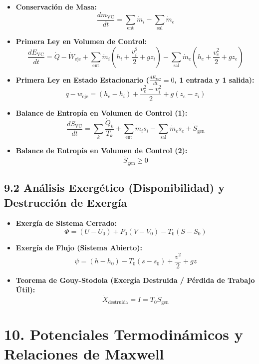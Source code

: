 \documentclass[11pt,a4paper]{article}
\begin{document}
\begin{itemize}
  \item \textbf{Conservación de Masa:}
  \[
    \frac{dm_{\mathrm{VC}}}{dt} = \sum_{\mathrm{ent}} \dot{m}_i - \sum_{\mathrm{sal}} \dot{m}_e
  \]
  \item \textbf{Primera Ley en Volumen de Control:}
  \[
    \frac{dE_{\mathrm{VC}}}{dt} = \dot{Q} - \dot{W}_{\mathrm{eje}} + \sum_{\mathrm{ent}} \dot{m}_i \left( h_i + \frac{v_i^2}{2} + g z_i \right) - \sum_{\mathrm{sal}} \dot{m}_e \left( h_e + \frac{v_e^2}{2} + g z_e \right)
  \]
  \item \textbf{Primera Ley en Estado Estacionario ($\frac{dE_{\mathrm{VC}}}{dt} = 0$, 1 entrada y 1 salida):}
  \[
    q - w_{\mathrm{eje}} = (h_e - h_i) + \frac{v_e^2 - v_i^2}{2} + g(z_e - z_i)
  \]
  \item \textbf{Balance de Entropía en Volumen de Control (1):}
  \[
    \frac{dS_{\mathrm{VC}}}{dt} = \sum_k \frac{\dot{Q}_k}{T_k} + \sum_{\mathrm{ent}} \dot{m}_i s_i - \sum_{\mathrm{sal}} \dot{m}_e s_e + \dot{S}_{\mathrm{gen}}
  \]
  \item \textbf{Balance de Entropía en Volumen de Control (2):}
  \[
    \dot{S}_{\mathrm{gen}} \ge 0
  \]
\end{itemize}

\subsection*{9.2 Análisis Exergético (Disponibilidad) y Destrucción de Exergía}

\begin{itemize}
  \item \textbf{Exergía de Sistema Cerrado:}
  \[
    \Phi = (U - U_0) + P_0(V - V_0) - T_0(S - S_0)
  \]
  \item \textbf{Exergía de Flujo (Sistema Abierto):}
  \[
    \psi = (h - h_0) - T_0(s - s_0) + \frac{v^2}{2} + gz
  \]
  \item \textbf{Teorema de Gouy-Stodola (Exergía Destruida / Pérdida de Trabajo Útil):}
  \[
    \dot{X}_{\text{destruida}} = I = T_0 \dot{S}_{\mathrm{gen}}
  \]
\end{itemize}

\section*{10. Potenciales Termodinámicos y Relaciones de Maxwell}
\end{document}
